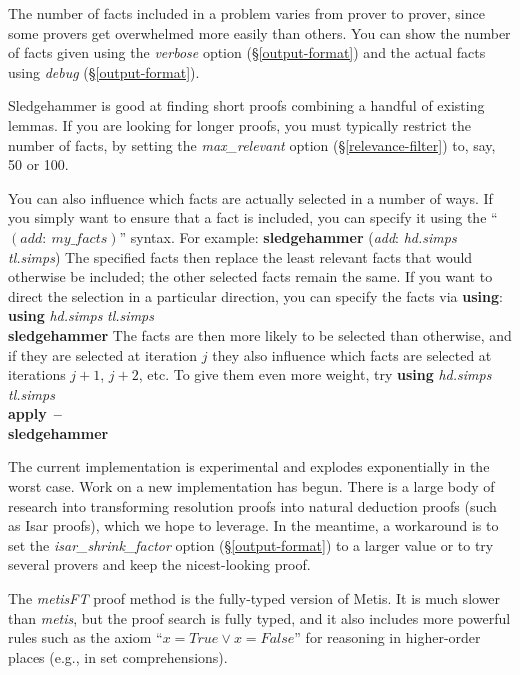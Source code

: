 \documentclass[a4paper,12pt]{article}
\begin{document}
The number of facts included in a problem varies from prover to prover, since
some provers get overwhelmed more easily than others. You can show the number of
facts given using the \textit{verbose} option (\S\ref{output-format}) and the
actual facts using \textit{debug} (\S\ref{output-format}).

Sledgehammer is good at finding short proofs combining a handful of existing
lemmas. If you are looking for longer proofs, you must typically restrict the
number of facts, by setting the \textit{max\_relevant} option
(\S\ref{relevance-filter}) to, say, 50 or 100.

You can also influence which facts are actually selected in a number of ways. If
you simply want to ensure that a fact is included, you can specify it using the
``$(\textit{add}{:}~\textit{my\_facts})$'' syntax. For example:
%
\prew
\textbf{sledgehammer} (\textit{add}: \textit{hd.simps} \textit{tl.simps})
\postw
%
The specified facts then replace the least relevant facts that would otherwise be
included; the other selected facts remain the same.
If you want to direct the selection in a particular direction, you can specify
the facts via \textbf{using}:
%
\prew
\textbf{using} \textit{hd.simps} \textit{tl.simps} \\
\textbf{sledgehammer}
\postw
%
The facts are then more likely to be selected than otherwise, and if they are
selected at iteration $j$ they also influence which facts are selected at
iterations $j + 1$, $j + 2$, etc. To give them even more weight, try
%
\prew
\textbf{using} \textit{hd.simps} \textit{tl.simps} \\
\textbf{apply}~\textbf{--} \\
\textbf{sledgehammer}
\postw


The current implementation is experimental and explodes exponentially in the
worst case. Work on a new implementation has begun. There is a large body of
research into transforming resolution proofs into natural deduction proofs (such
as Isar proofs), which we hope to leverage. In the meantime, a workaround is to
set the \textit{isar\_shrink\_factor} option (\S\ref{output-format}) to a larger
value or to try several provers and keep the nicest-looking proof.


The \textit{metisFT} proof method is the fully-typed version of Metis. It is
much slower than \textit{metis}, but the proof search is fully typed, and it
also includes more powerful rules such as the axiom ``$x = \mathit{True}
\mathrel{\lor} x = \mathit{False}$'' for reasoning in higher-order places (e.g.,
in set comprehensions).
\end{document}
